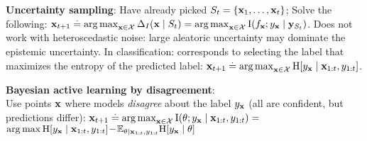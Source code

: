 \textbf{Uncertainty sampling}: Have already picked $S_t = \{\mathbf{x}_1, \dots, \mathbf{x}_t\}$; Solve the following: $\vx_{t+1} \defeq \argmax_{\vx \in \spX} \Delta_I(\vx \mid \sS_t) = \argmax_{\vx \in \spX} \Ism{f_\vx}{y_{\vx} \mid \vy_{\sS_t}}$. Does not work with heteroscedastic noise: large aleatoric uncertainty may dominate the epistemic uncertainty. In classification: corresponds to selecting the label that maximizes the entropy of the predicted label: $\vx_{t+1} \defeq \argmax_{\vx \in \spX} \H{y_{\vx} \mid \vx_{1:t}, y_{1:t}}$. \\
\begin{framed}
    \textbf{Bayesian active learning by disagreement}: \\
     Use points $\mathbf{x}$ where models \emph{disagree} about the label $y_{\mathbf{x}}$ (all are confident, but predictions differ): $\vx_{t+1} \defeq \argmax_{\vx \in \spX} \I{\vtheta}{y_{\vx} \mid \vx_{1:t}, y_{1:t}}=$ \\
     $ \argmax \H{y_{\vx} \mid \vx_{1:t}, y_{1:t}}\! -\! \E*[\vtheta \mid \vx_{1:t}, y_{1:t}]{\H{y_{\vx} \mid \vtheta}}$ 
\end{framed}
